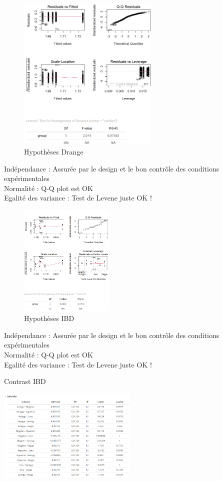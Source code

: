 \label{an:Drange}
\begin{figure}[ht]
\centering
\includegraphics[width=0.6\textwidth]{Image/hypothese Drange.png}
\caption{Hypothèses Drange}
\end{figure}
\noindent Indépendance : Assurée par le design et le bon contrôle des conditions expérimentales \\
Normalité : Q-Q plot est OK \\
Egalité des variance : Test de Levene juste OK !

\newpage

\label{an:IBD}
\begin{figure}[ht]
\centering
\includegraphics[width=0.4\textwidth]{Image/hypothese IBD}
\caption{Hypothèses IBD}
\end{figure}
\noindent Indépendance : Assurée par le design et le bon contrôle des conditions expérimentales \\
Normalité : Q-Q plot est OK \\
Egalité des variance : Test de Levene juste OK !
\begin{table}[ht]
\centering
\caption{Contrast IBD}
\includegraphics[width=0.5\textwidth]{Image/contrast IBD.png}
\end{table}

